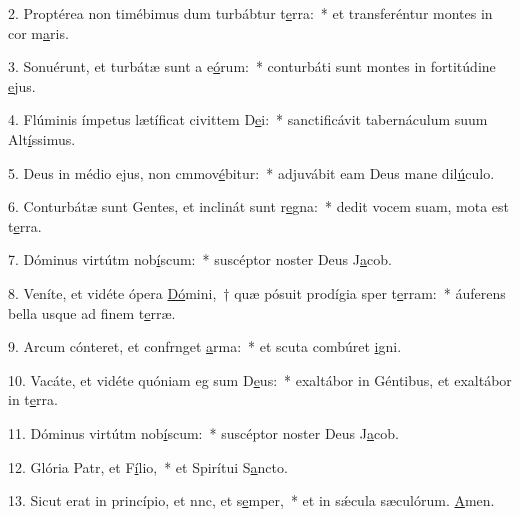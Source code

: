 2. Proptérea non timébimus dum turbábtur t\uline{e}rra:~* et transferéntur montes in cor m\uline{a}ris.\par 
3. Sonuérunt, et turbátæ sunt a e\uline{ó}rum:~* conturbáti sunt montes in fortitúdine \uline{e}jus.\par 
4. Flúminis ímpetus lætíficat civittem D\uline{e}i:~* sanctificávit tabernáculum suum Alt\uline{í}ssimus.\par 
5. Deus in médio ejus, non cmmov\uline{é}bitur:~* adjuvábit eam Deus mane dil\uline{ú}culo.\par 
6. Conturbátæ sunt Gentes, et inclinát sunt r\uline{e}gna:~* dedit vocem suam, mota est t\uline{e}rra.\par 
7. Dóminus virtútm nob\uline{í}scum:~* suscéptor noster Deus J\uline{a}cob.\par 
8. Veníte, et vidéte ópera \uline{Dó}mini,~† quæ pósuit prodígia sper t\uline{e}rram:~* áuferens bella usque ad finem t\uline{e}rræ.\par 
9. Arcum cónteret, et confrnget \uline{a}rma:~* et scuta combúret \uline{i}gni.\par 
10. Vacáte, et vidéte quóniam eg sum D\uline{e}us:~* exaltábor in Géntibus, et exaltábor in t\uline{e}rra.\par 
11. Dóminus virtútm nob\uline{í}scum:~* suscéptor noster Deus J\uline{a}cob.\par 
12. Glória Patr, et F\uline{í}lio,~* et Spirítui S\uline{a}ncto.\par 
13. Sicut erat in princípio, et nnc, et s\uline{e}mper,~* et in sǽcula sæculórum. \uline{A}men.\par 
